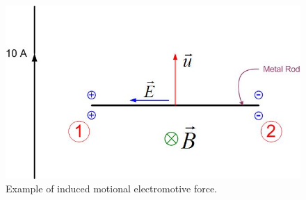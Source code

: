 \documentclass{ximera}
\begin{document}
\begin{figure}[htbp]
\begin{center}
\includegraphics[scale=0.5]{../jpg/motionalemf.jpg}
\end{center}
\caption{Example of induced motional electromotive force.}
\label{inducedemf}
\end{figure}
\end{document}
